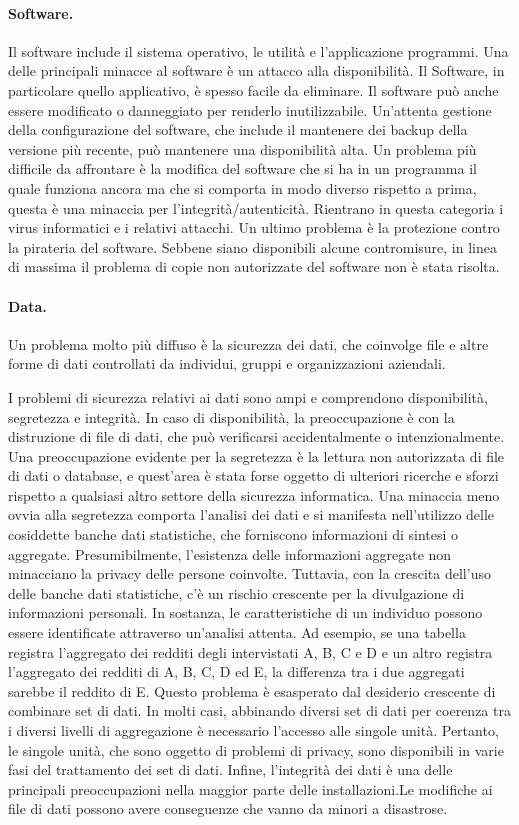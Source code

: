 \paragraph{Software.} Il software include il sistema operativo, le utilità e l'applicazione programmi. Una delle principali minacce al software è un attacco alla disponibilità. Il Software, in particolare quello applicativo, è spesso facile da eliminare. Il software può anche essere modificato o danneggiato per renderlo inutilizzabile. Un'attenta gestione della configurazione del software, che include il mantenere dei backup della versione più recente, può mantenere una disponibilità alta. Un problema più difficile da affrontare è la modifica del software che si ha in un programma il quale funziona ancora ma che si comporta in modo diverso rispetto a prima,
questa è una minaccia per l'integrità/autenticità. Rientrano in questa categoria i virus informatici e i relativi attacchi. Un ultimo problema è la protezione contro la pirateria del software. Sebbene siano disponibili alcune contromisure, in linea di massima il problema di copie non autorizzate del software non è stata risolta.

\paragraph{Data.}  Un  problema molto più diffuso è la sicurezza dei dati, che coinvolge file e altre forme di dati controllati da individui, gruppi e organizzazioni aziendali.

I problemi di sicurezza relativi ai dati sono ampi e comprendono disponibilità, segretezza e integrità. In caso di disponibilità, la preoccupazione è con la distruzione di file di dati, che può verificarsi accidentalmente o intenzionalmente. 
Una preoccupazione evidente per la segretezza è la lettura non autorizzata di file di dati o database, e quest'area è stata forse oggetto di ulteriori ricerche e sforzi rispetto a qualsiasi altro settore della sicurezza informatica. Una minaccia meno ovvia alla segretezza comporta l'analisi dei dati e si manifesta nell'utilizzo delle cosiddette banche dati statistiche, che forniscono informazioni di sintesi o aggregate. Presumibilmente, l'esistenza delle informazioni aggregate non minacciano la privacy delle persone coinvolte. Tuttavia, con la crescita dell'uso delle banche dati statistiche, c'è un rischio crescente per la divulgazione di informazioni personali. In sostanza, le caratteristiche di un individuo possono essere identificate attraverso un'analisi attenta. Ad esempio, se una tabella registra l'aggregato dei redditi degli intervistati A, B, C e D e un altro registra l'aggregato dei redditi di A, B, C, D ed E, la differenza tra i due aggregati sarebbe il reddito di E. Questo problema è esasperato dal desiderio crescente di combinare set di dati. In molti casi, abbinando diversi set di dati per coerenza tra i diversi livelli di aggregazione è necessario l'accesso alle singole unità. Pertanto, le singole unità, che sono oggetto di problemi di privacy, sono disponibili in varie fasi del trattamento dei set di dati. 
Infine, l'integrità dei dati è una delle principali preoccupazioni nella maggior parte delle installazioni.Le modifiche ai file di dati possono avere conseguenze che vanno da minori a disastrose.

